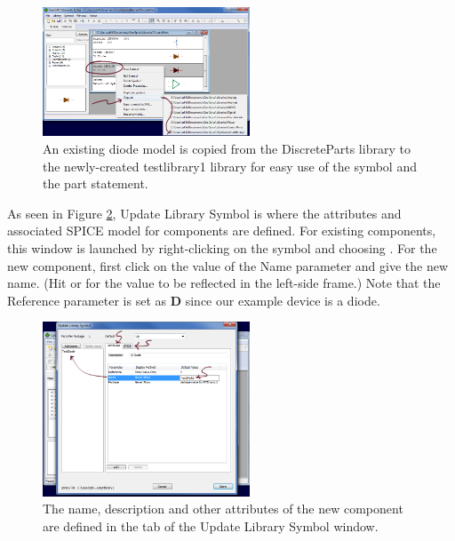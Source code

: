 \begin{figure}
  \includegraphics[width=0.55\textwidth]
	{./figures/getting_started_figures/SchematicEditor_copymodeltonewlibrary.png}
  \caption{An existing diode model is copied from the \textsf{DiscreteParts} library to the newly-created \textsf{testlibrary1} library for easy use of the symbol and the part statement.}
  \label{fig_schematiceditor_copysymboltolibrary}
\end{figure}


As seen in Figure \ref{fig_schematiceditor_updatelibrarysymbol}, \textsf{Update Library Symbol} is where the attributes and associated SPICE model for components are defined.  For existing components, this window is launched by right-clicking on the symbol and choosing  .  For the new component, first click on the value of the \textsf{Name} parameter and give the new name.  (Hit  or  for the value to be reflected in the left-side frame.)  Note that the \textsf{Reference} parameter is set as \textbf{D} since our example device is a diode.    

\begin{figure}
  \includegraphics[width=0.55\textwidth]
	{./figures/getting_started_figures/SchematicEditor_UpdateLibrarySymbol.png}
  \caption{The name, description and other attributes of the new component are defined in the  tab of the \textsf{Update Library Symbol} {window.}}
  \label{fig_schematiceditor_updatelibrarysymbol}
\end{figure}

